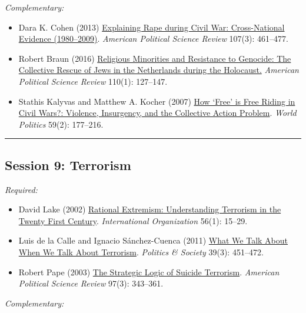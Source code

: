 \documentclass[12pt, a4paper]{article}
\begin{document}
\noindent\textit{Complementary:}

\begin{itemize}
	\item Dara K. Cohen (2013) \href{https://doi.org/10.1017/S0003055413000221}{Explaining Rape during Civil War: Cross-National Evidence (1980–2009)}. \textit{American Political Science Review} 107(3): 461--477.
  \item Robert Braun (2016) \href{https://doi.org/10.1017/S0003055415000544}{Religious Minorities and Resistance to Genocide: The Collective Rescue of Jews in the Netherlands during the Holocaust.} \textit{American Political Science Review} 110(1): 127--147.
  \item Stathis Kalyvas and Matthew A. Kocher (2007) \href{https://doi.org/10.1353/wp.2007.0023}{How `Free' is Free Riding in Civil Wars?: Violence, Insurgency, and the Collective Action Problem}. \textit{World Politics} 59(2): 177--216.
\end{itemize}

\vspace{20pt}
\hrule
\subsection*{Session 9: Terrorism}

\noindent\textit{Required:}


\begin{itemize}
	\item David Lake (2002) \href{https://doi.org/10.1017/S777777770200002X}{Rational Extremism: Understanding Terrorism in the Twenty First Century}. \textit{International Organization} 56(1): 15--29.
  \item Luis de la Calle and Ignacio Sánchez-Cuenca (2011) \href{https://doi.org/10.1177/0032329211415506}{What We Talk About When We Talk About Terrorism}. \textit{Politics \& Society} 39(3): 451--472.
  \item Robert Pape (2003) \href{https://doi.org/10.1017/S000305540300073X}{The Strategic Logic of Suicide Terrorism}. \textit{American Political Science Review} 97(3): 343--361.
\end{itemize}

\noindent\textit{Complementary:}
\end{document}

